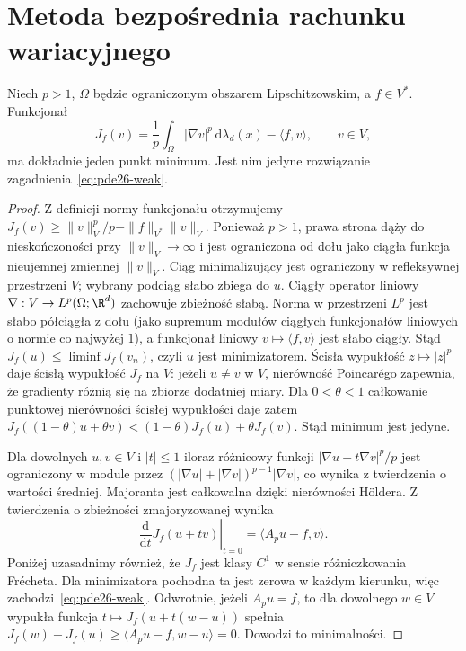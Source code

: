 \section{Metoda bezpośrednia rachunku wariacyjnego}
\begin{twierdzenie}\label{thm:pde26-minimizer}
Niech $p>1$, $\Omega$ będzie ograniczonym obszarem
Lipschitzowskim, a $f\in V^*$. Funkcjonał
\[
 J_f(v)=\frac1p\int_\Omega|\nabla v|^p
 \,\mathrm d\lambda_d(x)-\langle f,v\rangle,\qquad v\in V,
\]
ma dokładnie jeden punkt minimum. Jest nim jedyne
rozwiązanie zagadnienia~\eqref{eq:pde26-weak}.
\end{twierdzenie}
\begin{proof}
Z definicji normy funkcjonału otrzymujemy
$J_f(v)\ge\|v\|_V^p/p-\|f\|_{V^*}\|v\|_V$.
Ponieważ $p>1$, prawa strona dąży do nieskończoności
przy $\|v\|_V\to\infty$ i jest ograniczona od dołu
jako ciągła funkcja nieujemnej zmiennej $\|v\|_V$.
Ciąg minimalizujący jest ograniczony w refleksywnej
przestrzeni $V$; wybrany podciąg słabo zbiega do $u$.
Ciągły operator liniowy $\nabla:V\to L^p(\Omega;\R^d)$
zachowuje zbieżność słabą. Norma w przestrzeni $L^p$
jest słabo półciągła z dołu (jako supremum modułów
ciągłych funkcjonałów liniowych o normie co najwyżej $1$),
a funkcjonał liniowy $v\mapsto\langle f,v\rangle$
jest słabo ciągły. Stąd $J_f(u)\le\liminf J_f(v_n)$,
czyli $u$ jest minimizatorem. Ścisła wypukłość
$z\mapsto|z|^p$ daje ścisłą wypukłość $J_f$ na $V$:
jeżeli $u\ne v$ w $V$, nierówność Poincarégo
zapewnia, że gradienty różnią się na zbiorze dodatniej
miary. Dla $0<\theta<1$ całkowanie punktowej nierówności
ścisłej wypukłości daje zatem
$J_f((1-\theta)u+\theta v)<(1-\theta)J_f(u)+\theta J_f(v)$.
Stąd minimum jest jedyne.

Dla dowolnych $u,v\in V$ i $|t|\le1$ iloraz różnicowy
funkcji $|\nabla u+t\nabla v|^p/p$ jest ograniczony
w module przez $(|\nabla u|+|\nabla v|)^{p-1}|\nabla v|$,
co wynika z twierdzenia o wartości średniej.
Majoranta jest całkowalna dzięki nierówności Höldera.
Z twierdzenia o zbieżności zmajoryzowanej wynika
\[
 \left.\frac{\mathrm d}{\mathrm dt}J_f(u+tv)\right|_{t=0}
 =\langle A_pu-f,v\rangle.
\]
Poniżej uzasadnimy również, że $J_f$ jest klasy $C^1$
w sensie różniczkowania Frécheta.
Dla minimizatora pochodna ta jest zerowa w każdym
kierunku, więc zachodzi~\eqref{eq:pde26-weak}.
Odwrotnie, jeżeli $A_pu=f$, to dla dowolnego $w\in V$
wypukła funkcja $t\mapsto J_f(u+t(w-u))$ spełnia
$J_f(w)-J_f(u)\ge\langle A_pu-f,w-u\rangle=0$.
Dowodzi to minimalności.
\end{proof}

